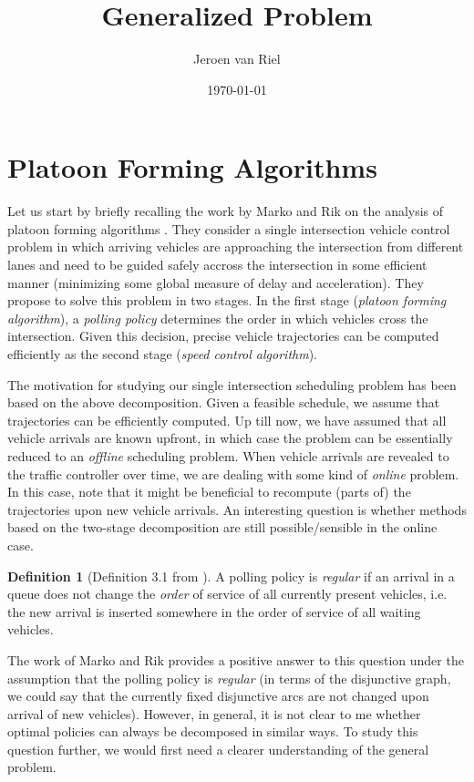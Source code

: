\documentclass{article}
\title{Generalized Problem}
\author{Jeroen van Riel}
\date{\monthyeardate\today}
\theoremstyle{definition}
\newtheorem{define}{Definition}[section]
\theoremstyle{plain}
\begin{document}
\maketitle

\section{Platoon Forming Algorithms}

Let us start by briefly recalling the work by Marko and Rik on the analysis of
platoon forming algorithms \cite{timmermanPlatoonFormingAlgorithms2021}. They
consider a single intersection vehicle control problem in which arriving
vehicles are approaching the intersection from different lanes and need to be
guided safely accross the intersection in some efficient manner (minimizing some
global measure of delay and acceleration). They propose to solve this problem in
two stages. In the first stage (\textit{platoon forming algorithm}), a
\textit{polling policy} determines the order in which vehicles cross the
intersection. Given this decision, precise vehicle trajectories can be computed
efficiently as the second stage (\textit{speed control algorithm}).

The motivation for studying our single intersection scheduling problem has been
based on the above decomposition. Given a feasible schedule, we assume that
trajectories can be efficiently computed. Up till now, we have assumed that all
vehicle arrivals are known upfront, in which case the problem can be essentially
reduced to an \textit{offline} scheduling problem. When vehicle arrivals are
revealed to the traffic controller over time, we are dealing with some kind of
\textit{online} problem. In this case, note that it might be beneficial to
recompute (parts of) the trajectories upon new vehicle arrivals. An interesting
question is whether methods based on the two-stage decomposition are still
possible/sensible in the online case.

\begin{define}[Definition 3.1 from \cite{timmermanPlatoonFormingAlgorithms2021}]
  \label{def:regular}
  A polling policy is \textit{regular} if an arrival in a queue does not change
  the \textit{order} of service of all currently present vehicles, i.e. the new
  arrival is inserted somewhere in the order of service of all waiting vehicles.
\end{define}

The work of Marko and Rik provides a positive answer to this question under the
assumption that the polling policy is \textit{regular} (in terms of the
disjunctive graph, we could say that the currently fixed disjunctive arcs are
not changed upon arrival of new vehicles). However, in general, it is not clear
to me whether optimal policies can always be decomposed in similar ways. To
study this question further, we would first need a clearer understanding of the
general problem.
\end{document}
